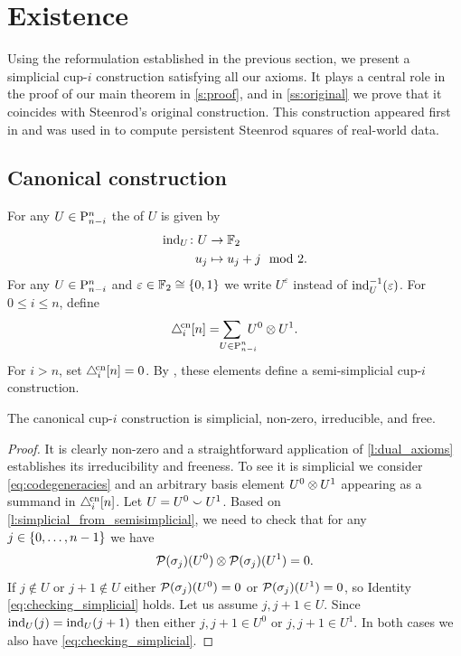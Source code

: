 \section{Existence}

Using the reformulation established in the previous section, we present a simplicial cup-\(i\) construction satisfying all our axioms.
It plays a central role in the proof of our main theorem in \cref{s:proof}, and in \cref{ss:original} we prove that it coincides with Steenrod's original construction.
This construction appeared first in \cite{medina2025fast_sq} and was used in \cite{medina2022per_st} to compute persistent Steenrod squares of real-world data.

\subsection{Canonical construction}

For any $U \in \mathrm{P}^n_{n-i}$ the  of $U$ is given by
\[
\begin{split}
	\operatorname{ind}_U \colon U &\to {\mathbb{F}_2} \\
	u_j &\mapsto u_j + j \mod 2.
\end{split}
\]
For any $U \in \mathrm{P}^n_{n-i}$ and $\varepsilon \in {\mathbb{F}_2} \cong \{0,1\}$ we write $U^\varepsilon$ instead of $\operatorname{ind}_U^{-1}(\varepsilon)$.
For $0 \leq i \leq n$, define
\[
\canonical_i[n] =
\sum_{\mathclap{\quad U \in \rP^n_{n-i}}} \ U^0 \ot U^1.
\]
For $i>n$, set $\triangle^{\!\mathrm{cn}}_i[n]=0$.
By \cite[Theorem~10]{medina2025fast_sq}, these elements define a semi-simplicial \mbox{cup-$i$} construction.

\begin{theorem}\label{t:existence}
	The canonical \mbox{cup-$i$} construction is simplicial, non-zero, irreducible, and free.
\end{theorem}

\begin{proof}
	It is clearly non-zero and a straightforward application of \cref{l:dual_axioms} establishes its irreducibility and freeness.
	To see it is simplicial we consider \cref{eq:codegeneracies} and an arbitrary basis element $U^0 \otimes U^1$ appearing as a summand in $\triangle^{\!\mathrm{cn}}_i[n]$.
	Let $U = U^0 \union U^1$.
	Based on \cref{l:simplicial_from_semisimplicial}, we need to check that for any $j \in \{0,\dots,n-1\}$ we have
	\begin{equation}\label{eq:checking_simplicial}
		\mathcal{P}(\sigma_j)(U^0) \otimes \mathcal{P}(\sigma_j)(U^1) = 0.
	\end{equation}
	If $j \notin U$ or $j+1 \notin U$ either $\mathcal{P}(\sigma_j)(U^0) = 0$ or $\mathcal{P}(\sigma_j)(U^1) = 0$, so Identity \eqref{eq:checking_simplicial} holds.
	Let us assume $j,j+1 \in U$.
	Since $\operatorname{ind}_U(j) = \operatorname{ind}_U(j+1)$ then either $j,j+1 \in U^0$ or $j,j+1 \in U^1$.
	In both cases we also have \eqref{eq:checking_simplicial}.
\end{proof}

